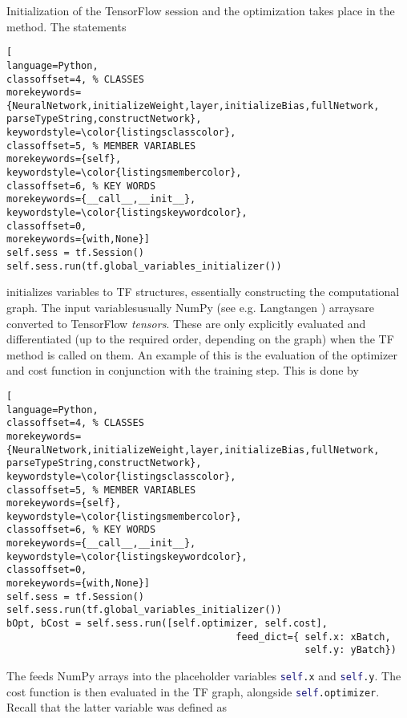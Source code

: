 \documentclass[../../master.tex]{subfiles}
\begin{document}
Initialization of the TensorFlow session and the optimization takes place in the  method.
The statements 
\begin{lstlisting}[
language=Python,
classoffset=4, % CLASSES
morekeywords={NeuralNetwork,initializeWeight,layer,initializeBias,fullNetwork, parseTypeString,constructNetwork},
keywordstyle=\color{listingsclasscolor},
classoffset=5, % MEMBER VARIABLES
morekeywords={self},
keywordstyle=\color{listingsmembercolor},
classoffset=6, % KEY WORDS
morekeywords={__call__,__init__},
keywordstyle=\color{listingskeywordcolor},
classoffset=0,
morekeywords={with,None}]
self.sess = tf.Session()
self.sess.run(tf.global_variables_initializer())
\end{lstlisting}
initializes variables to TF structures, essentially constructing the computational graph. The input variables\textemdash usually NumPy (see e.g. Langtangen \cite{primer}) arrays\textemdash are converted to TensorFlow \emph{tensors}. These are only explicitly evaluated and differentiated (up to the required order, depending on the graph) when the TF  method is called on them. An example of this is the evaluation of the optimizer and cost function in conjunction with the training step. This is done by 
\begin{lstlisting}[
language=Python,
classoffset=4, % CLASSES
morekeywords={NeuralNetwork,initializeWeight,layer,initializeBias,fullNetwork, parseTypeString,constructNetwork},
keywordstyle=\color{listingsclasscolor},
classoffset=5, % MEMBER VARIABLES
morekeywords={self},
keywordstyle=\color{listingsmembercolor},
classoffset=6, % KEY WORDS
morekeywords={__call__,__init__},
keywordstyle=\color{listingskeywordcolor},
classoffset=0,
morekeywords={with,None}]
self.sess = tf.Session()
self.sess.run(tf.global_variables_initializer())
bOpt, bCost = self.sess.run([self.optimizer, self.cost], 
                                        feed_dict={ self.x: xBatch, 
                                                    self.y: yBatch})
\end{lstlisting}
The  feeds NumPy arrays into the placeholder variables \lstinline[language={Python},classoffset={4}, morekeywords={self}, keywordstyle=\color{listingsmembercolor}, classoffset={0}]{self.x} and \lstinline[language={Python},classoffset={4}, morekeywords={self}, keywordstyle=\color{listingsmembercolor}, classoffset={0}]{self.y}. The cost function is then evaluated in the TF graph, alongside \lstinline[language={Python},classoffset={4}, morekeywords={self}, keywordstyle=\color{listingsmembercolor}, classoffset={0}]{self.optimizer}. Recall that the latter variable was defined as 
\end{document}
